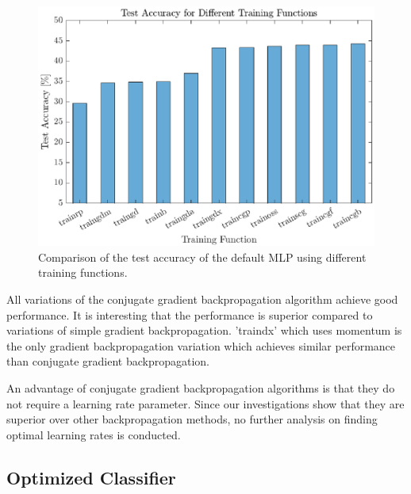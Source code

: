  \begin{figure}[h!]
 	\centering
 	\includegraphics{images/trainingFct}
 	\caption{Comparison of the test accuracy of the default MLP using different training functions.}
 	\label{fig:trainingFct}
 \end{figure}

 All variations of the conjugate gradient backpropagation algorithm\cite{moller1993scaled} achieve good performance. It is interesting that the performance is superior compared to variations of simple gradient backpropagation. 'traindx' which uses momentum is the only gradient backpropagation variation which achieves similar performance than conjugate gradient backpropagation.

 An advantage of conjugate gradient backpropagation algorithms is that they do not require a learning rate parameter. Since our investigations show that they are superior over other backpropagation methods, no further analysis on finding optimal learning rates is conducted.

\subsection{Optimized Classifier}


